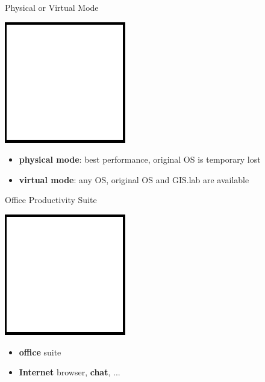 \documentclass[12pt]{beamer}
\begin{document}
\begin{frame}{Physical or Virtual Mode}
	\begin{center}
		\includegraphics[keepaspectratio=true,height=0.5\textheight]{images/image.png}
	\end{center}
	\begin{itemize}
		\item \textbf{physical mode}: best performance, original OS is temporary lost
		\item \textbf{virtual mode}: any OS, original OS and GIS.lab are available
	\end{itemize}
\end{frame}

\begin{frame}{Office Productivity Suite}
	\begin{center}
		\includegraphics[keepaspectratio=true,height=0.5\textheight]{images/image.png}
	\end{center}
	\begin{itemize}
		\item \textbf{office} suite
		\item \textbf{Internet} browser, \textbf{chat}, ...
	\end{itemize}
\end{frame}
\end{document}
